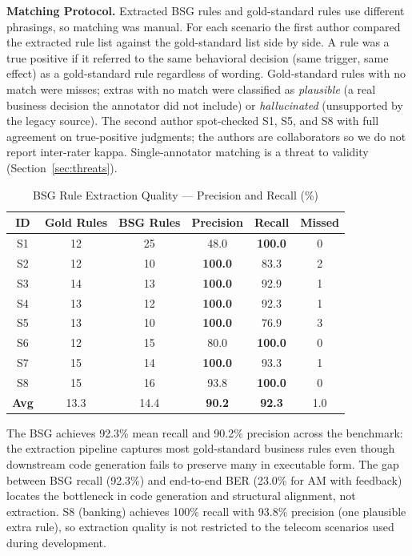 \documentclass[conference]{IEEEtran}
\begin{document}
\textbf{Matching Protocol.} Extracted BSG rules and gold-standard rules use different phrasings, so matching was manual. For each scenario the first author compared the extracted rule list against the gold-standard list side by side. A rule was a true positive if it referred to the same behavioral decision (same trigger, same effect) as a gold-standard rule regardless of wording. Gold-standard rules with no match were misses; extras with no match were classified as \textit{plausible} (a real business decision the annotator did not include) or \textit{hallucinated} (unsupported by the legacy source). The second author spot-checked S1, S5, and S8 with full agreement on true-positive judgments; the authors are collaborators so we do not report inter-rater kappa. Single-annotator matching is a threat to validity (Section~\ref{sec:threats}).

\begin{table}[htbp]
\caption{BSG Rule Extraction Quality --- Precision and Recall (\%)}
\label{tab:rq5}
\centering
\footnotesize
\begin{tabular}{@{}cccccc@{}}
\toprule
\textbf{ID} & \textbf{Gold Rules} & \textbf{BSG Rules} & \textbf{Precision} & \textbf{Recall} & \textbf{Missed} \\
\midrule
S1 & 12 & 25 & 48.0 & \textbf{100.0} & 0 \\
S2 & 12 & 10 & \textbf{100.0} & 83.3 & 2 \\
S3 & 14 & 13 & \textbf{100.0} & 92.9 & 1 \\
S4 & 13 & 12 & \textbf{100.0} & 92.3 & 1 \\
S5 & 13 & 10 & \textbf{100.0} & 76.9 & 3 \\
S6 & 12 & 15 & 80.0 & \textbf{100.0} & 0 \\
S7 & 15 & 14 & \textbf{100.0} & 93.3 & 1 \\
S8 & 15 & 16 & 93.8 & \textbf{100.0} & 0 \\
\midrule
\textbf{Avg} & 13.3 & 14.4 & \textbf{90.2} & \textbf{92.3} & 1.0 \\
\bottomrule
\end{tabular}
\end{table}

The BSG achieves 92.3\% mean recall and 90.2\% precision across the benchmark: the extraction pipeline captures most gold-standard business rules even though downstream code generation fails to preserve many in executable form. The gap between BSG recall (92.3\%) and end-to-end BER (23.0\% for AM with feedback) locates the bottleneck in code generation and structural alignment, not extraction. S8 (banking) achieves 100\% recall with 93.8\% precision (one plausible extra rule), so extraction quality is not restricted to the telecom scenarios used during development.
\end{document}
